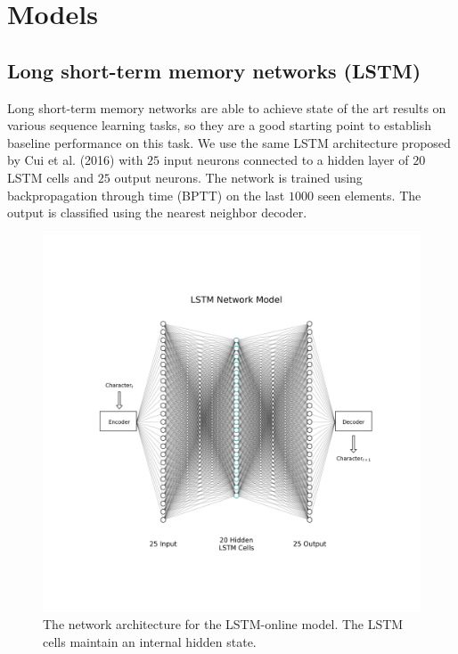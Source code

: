 \documentclass{article}
\begin{document}
\section*{Models}

\subsection*{Long short-term memory networks (LSTM)}

Long short-term memory \cite{hochreiter1997long} networks are able to achieve state of the art results on various sequence learning tasks, so they are a good starting point to establish baseline performance on this task. We use the same LSTM architecture proposed by Cui et al. (2016) with $25$ input neurons connected to a hidden layer of $20$ LSTM cells and $25$ output neurons. The network is trained using backpropagation through time (BPTT) \cite{mozer1995focused} on the last $1000$ seen elements. The output is classified using the nearest neighbor decoder.

\begin{figure}[!h]
    \centering
    \includegraphics[width=\linewidth]{../diagrams/lstm.png}
    \caption{The network architecture for the LSTM-online model. The LSTM cells maintain an internal hidden state.}
    \label{fig:lstm-online-model}
\end{figure}
\end{document}

